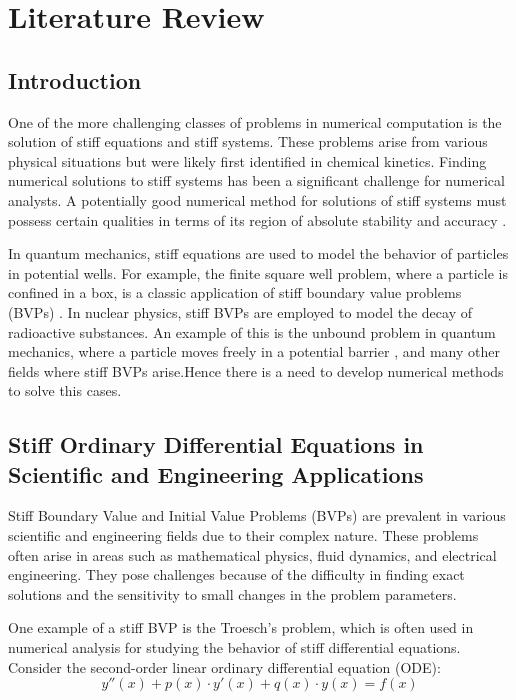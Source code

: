 \chapter{Literature Review}
\section{Introduction}
One of the more challenging classes of problems in numerical computation is the solution of stiff equations and stiff systems. These problems arise from various physical situations but were likely first identified in chemical kinetics. Finding numerical solutions to stiff systems has been a significant challenge for numerical analysts. A potentially good numerical method for solutions of stiff systems must possess certain qualities in terms of its region of absolute stability and accuracy \cite{QURESH2024}.

In quantum mechanics, stiff equations are used to model the behavior of particles in potential wells. For example, the finite square well problem, where a particle is confined in a box, is a classic application of stiff boundary value problems (BVPs) \cite{cappellaro:bound-problems}. In nuclear physics, stiff BVPs are employed to model the decay of radioactive substances. An example of this is the unbound problem in quantum mechanics, where a particle moves freely in a potential barrier \cite{cappellaro:unbound-problems}, and many other fields where stiff BVPs arise.Hence there is a need to develop numerical methods to solve this cases.


\section{Stiff Ordinary Differential Equations in Scientific and Engineering Applications}
Stiff Boundary Value and Initial Value Problems (BVPs) are prevalent in various scientific and engineering fields due to their complex nature. These problems often arise in areas such as mathematical physics, fluid dynamics, and electrical engineering. They pose challenges because of the difficulty in finding exact solutions and the sensitivity to small changes in the problem parameters.

One example of a stiff BVP is the Troesch's problem, which is often used in numerical analysis for studying the behavior of stiff differential equations.
Consider the second-order linear ordinary differential equation (ODE):
\begin{equation}
    y''(x) + p(x) \cdot y'(x) + q(x) \cdot y(x) = f(x)
\end{equation}

